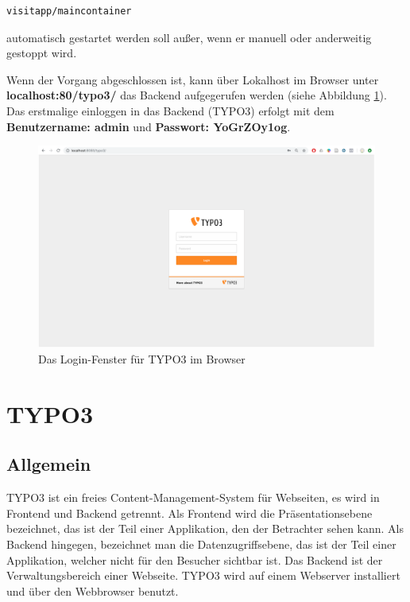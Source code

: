 \begin{lstlisting}[style=MyBashStyle, caption={Angabe des Docker Containers}]
visitapp/maincontainer
\end{lstlisting} automatisch gestartet werden soll außer, wenn er manuell oder anderweitig gestoppt wird.

Wenn der Vorgang abgeschlossen ist, kann über Lokalhost im Browser unter \textbf{localhost:80/typo3/} das Backend aufgegerufen werden (siehe Abbildung \ref{img:typo_3_login}). Das erstmalige einloggen in das Backend (TYPO3) erfolgt mit dem \textbf{Benutzername: admin} und \textbf{Passwort: YoGrZOy1og}.

\begin{figure}[ht!]
\centering
\includegraphics[width=12cm]{Figures/paula/typo3/typo_3_login.png}
\caption{Das Login-Fenster für TYPO3 im Browser}
\label{img:typo_3_login}
\end{figure}



\section{TYPO3}
\subsection{Allgemein}

TYPO3 ist ein freies Content-Management-System für Webseiten, es wird in Frontend und Backend getrennt. Als Frontend wird die Präsentationsebene bezeichnet, das ist der Teil einer Applikation, den der Betrachter sehen kann. Als Backend hingegen, bezeichnet man die Datenzugriffsebene, das ist der Teil einer Applikation, welcher nicht für den Besucher sichtbar ist. Das Backend ist der Verwaltungsbereich einer Webseite. TYPO3 wird auf einem Webserver installiert und über den Webbrowser benutzt.


